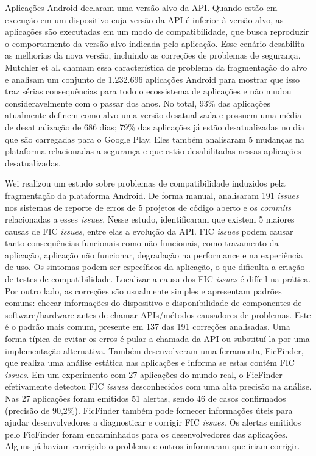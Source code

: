 Aplicações Android declaram uma versão alvo da API. Quando estão em execução em
um dispositivo cuja versão da API é inferior à versão alvo, as aplicações são
executadas em um modo de compatibilidade, que busca reproduzir o comportamento
da versão alvo indicada pelo aplicação. Esse cenário desabilita as melhorias da
nova versão, incluindo as correções de problemas de segurança. Mutchler et al.
\cite{Mutchler2016}
chamam essa característica de problema da fragmentação do alvo e analisam um
conjunto de 1.232.696 aplicações Android para mostrar que isso traz sérias
consequências para todo o ecossistema de aplicações e não mudou consideravelmente
com o 
passar dos anos. No total, 93\% das aplicações atualmente definem como alvo uma
versão desatualizada e possuem uma média de desatualização de 686 dias; 79\% das
aplicações já estão desatualizadas no dia que são carregadas para o Google Play.
Eles também analisaram 5 mudanças na plataforma relacionadas a segurança e que estão
desabilitadas nessas aplicações desatualizadas.

Wei \cite{Wei2016} realizou um estudo sobre problemas de compatibilidade induzidos
pela fragmentação 
 da plataforma
Android.
De forma manual, analisaram 191 \textit{issues} nos sistemas de reporte de erros
de 5 projetos de código aberto e os \textit{commits} relacionadas a esses \textit{issues}.
Nesse estudo, identificaram que existem 5 maiores causas de FIC \textit{issues}, entre elas
a evolução da API. FIC \textit{issues} podem causar tanto consequências funcionais como
não-funcionais, como travamento da aplicação, aplicação não funcionar, degradação
na performance e na experiência de uso. Os sintomas podem ser específicos da aplicação,
o que dificulta a criação de testes de compatibilidade. Localizar a causa dos FIC
\textit{issues} é difícil na prática. Por outro lado, as correções são usualmente
simples e apresentam padrões comuns: checar informações do dispositivo e disponibilidade
de componentes de software/hardware antes de chamar APIs/métodos causadores de
problemas. Este é o padrão mais comum, presente em 137 das 191 correções analisadas.
Uma forma típica de evitar os erros é pular a chamada da API ou substituí-la por
uma implementação alternativa. Também desenvolveram uma ferramenta, FicFinder, que
realiza uma análise estática nas aplicações e informa se estas contém FIC
\textit{issues}. Em um experimento com 27 aplicações do mundo real, o FicFinder
efetivamente detectou FIC \textit{issues} desconhecidos com
uma alta precisão na análise. Nas 27 aplicações foram emitidos 51 alertas, sendo
46 de casos confirmados (precisão de 90,2\%). FicFinder também pode fornecer
informações úteis para ajudar desenvolvedores a diagnosticar e corrigir FIC
\textit{issues}. Os alertas emitidos pelo FicFinder foram encaminhados para os
desenvolvedores das aplicações. Alguns já haviam corrigido o problema e outros
informaram que iriam corrigir.

